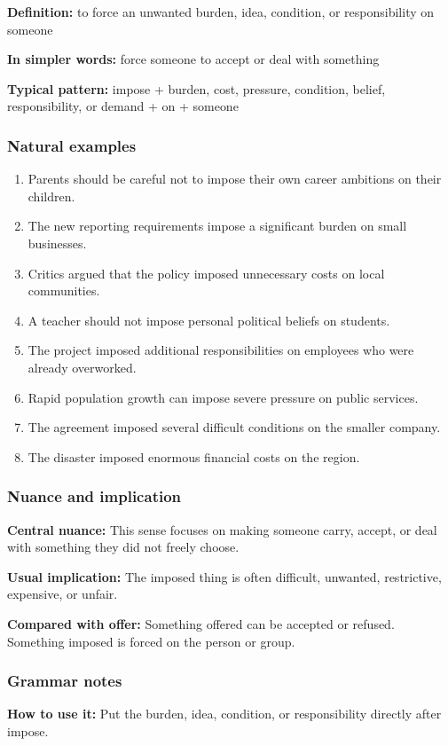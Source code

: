 \documentclass[11pt]{article}
\begin{document}
\textbf{Definition:} to force an unwanted burden, idea, condition, or responsibility on someone

\textbf{In simpler words:} force someone to accept or deal with something

\textbf{Typical pattern:} impose + burden, cost, pressure, condition, belief, responsibility, or demand + on + someone

\subsubsection{Natural examples}
\begin{enumerate}
  \item Parents should be careful not to impose their own career ambitions on their children.
  \item The new reporting requirements impose a significant burden on small businesses.
  \item Critics argued that the policy imposed unnecessary costs on local communities.
  \item A teacher should not impose personal political beliefs on students.
  \item The project imposed additional responsibilities on employees who were already overworked.
  \item Rapid population growth can impose severe pressure on public services.
  \item The agreement imposed several difficult conditions on the smaller company.
  \item The disaster imposed enormous financial costs on the region.
\end{enumerate}

\subsubsection{Nuance and implication}
\textbf{Central nuance:} This sense focuses on making someone carry, accept, or deal with something they did not freely choose.

\textbf{Usual implication:} The imposed thing is often difficult, unwanted, restrictive, expensive, or unfair.

\textbf{Compared with offer:} Something offered can be accepted or refused. Something imposed is forced on the person or group.

\subsubsection{Grammar notes}
\textbf{How to use it:} Put the burden, idea, condition, or responsibility directly after impose.
\end{document}
